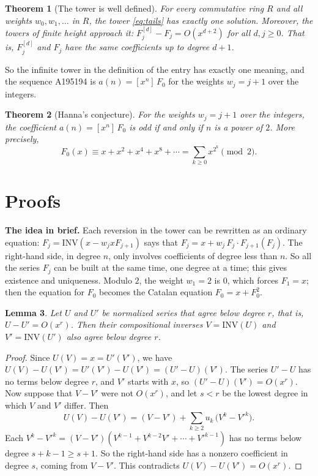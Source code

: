 \documentclass[11pt,a4paper]{article}
\newtheorem{theorem}{Theorem}[section]
\newtheorem{lemma}[theorem]{Lemma}
\theoremstyle{definition}
\theoremstyle{remark}
\newcommand{\coeff}[2]{[x^{#1}]\,#2}
\newcommand{\para}[1]{\par\medskip\noindent\textbf{#1}\enspace}
\begin{document}
\begin{theorem}[The tower is well defined]\label{thm:tails}
For every commutative ring $R$ and all weights $w_0,w_1,\dots$ in $R$, the tower \eqref{eq:tails} has exactly one
solution. Moreover, the towers of finite height approach it: $F^{[d]}_j-F_j=O(x^{d+2})$ for all $d,j\ge0$. That is,
$F^{[d]}_j$ and $F_j$ have the same coefficients up to degree $d+1$.
\end{theorem}

So the infinite tower in the definition of the entry has exactly one meaning, and the sequence A195194 is
$a(n)=\coeff{n}{F_0}$ for the weights $w_j=j+1$ over the integers.

\begin{theorem}[Hanna's conjecture]\label{thm:parity}
For the weights $w_j=j+1$ over the integers, the coefficient $a(n)=\coeff{n}{F_0}$ is odd if and only if $n$ is a power
of $2$. More precisely,
\[
F_0(x)\equiv x+x^2+x^4+x^8+\cdots=\sum_{k\ge0}x^{2^k}\pmod 2 .
\]
\end{theorem}

\section{Proofs}\label{sec:proofs}

\para{The idea in brief.} Each reversion in the tower can be rewritten as an ordinary equation:
$F_j=\mathrm{INV}(x-w_jxF_{j+1})$ says that $F_j=x+w_j\,F_j\cdot F_{j+1}(F_j)$. The right-hand side, in degree $n$,
only involves coefficients of degree less than $n$. So all the series $F_j$ can be built at the same time, one degree at
a time; this gives existence and uniqueness. Modulo $2$, the weight $w_1=2$ is $0$, which forces $F_1=x$; then the
equation for $F_0$ becomes the Catalan equation $F_0=x+F_0^2$.

\begin{lemma}\label{lem:agree}
Let $U$ and $U'$ be normalized series that agree below degree $r$, that is, $U-U'=O(x^r)$. Then their compositional
inverses $V=\mathrm{INV}(U)$ and $V'=\mathrm{INV}(U')$ also agree below degree $r$.
\end{lemma}

\begin{proof}
Since $U(V)=x=U'(V')$, we have $U(V)-U(V')=U'(V')-U(V')=(U'-U)(V')$. The series $U'-U$ has no terms below degree $r$,
and $V'$ starts with $x$, so $(U'-U)(V')=O(x^r)$. Now suppose that $V-V'$ were not $O(x^r)$, and let $s<r$ be the lowest
degree in which $V$ and $V'$ differ. Then
\[
U(V)-U(V')=(V-V')+\sum_{k\ge2}u_k\,\bigl(V^k-V'^k\bigr).
\]
Each $V^k-V'^k=(V-V')(V^{k-1}+V^{k-2}V'+\cdots+V'^{k-1})$ has no terms below degree $s+k-1\ge s+1$. So the right-hand
side has a nonzero coefficient in degree $s$, coming from $V-V'$. This contradicts $U(V)-U(V')=O(x^r)$.
\end{proof}
\end{document}
